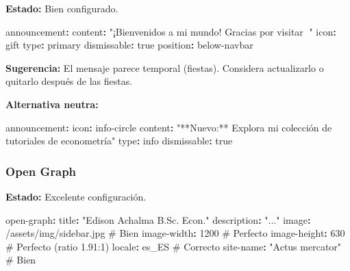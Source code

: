 \documentclass[
  doc,
  floatsintext,
  longtable,
  a4paper,
  nolmodern,
  notxfonts,
  notimes,
  12pt,
  colorlinks=true,linkcolor=blue,citecolor=blue,urlcolor=blue]{apa7}
\newenvironment{Shaded}{\begin{snugshade}}{\end{snugshade}}
\newcommand{\AttributeTok}[1]{\textcolor[rgb]{0.40,0.45,0.13}{#1}}
\newcommand{\CharTok}[1]{\textcolor[rgb]{0.13,0.47,0.30}{#1}}
\newcommand{\CommentTok}[1]{\textcolor[rgb]{0.37,0.37,0.37}{#1}}
\newcommand{\DecValTok}[1]{\textcolor[rgb]{0.68,0.00,0.00}{#1}}
\newcommand{\FunctionTok}[1]{\textcolor[rgb]{0.28,0.35,0.67}{#1}}
\newcommand{\KeywordTok}[1]{\textcolor[rgb]{0.00,0.23,0.31}{\textbf{#1}}}
\newcommand{\StringTok}[1]{\textcolor[rgb]{0.13,0.47,0.30}{#1}}
\begin{document}
\textbf{Estado:} Bien configurado.

\begin{Shaded}
\begin{Highlighting}[]
\FunctionTok{announcement}\KeywordTok{:}
\AttributeTok{  }\FunctionTok{content}\KeywordTok{:}\AttributeTok{ }\StringTok{"¡Bienvenidos a mi mundo! Gracias por visitar 🎄"}
\AttributeTok{  }\FunctionTok{icon}\KeywordTok{:}\AttributeTok{ gift}
\AttributeTok{  }\FunctionTok{type}\KeywordTok{:}\AttributeTok{ primary}
\AttributeTok{  }\FunctionTok{dismissable}\KeywordTok{:}\AttributeTok{ }\CharTok{true}
\AttributeTok{  }\FunctionTok{position}\KeywordTok{:}\AttributeTok{ below{-}navbar}
\end{Highlighting}
\end{Shaded}

\textbf{Sugerencia:} El mensaje parece temporal (fiestas). Considera
actualizarlo o quitarlo después de las fiestas.

\textbf{Alternativa neutra:}

\begin{Shaded}
\begin{Highlighting}[]
\FunctionTok{announcement}\KeywordTok{:}
\AttributeTok{  }\FunctionTok{icon}\KeywordTok{:}\AttributeTok{ info{-}circle}
\AttributeTok{  }\FunctionTok{content}\KeywordTok{:}\AttributeTok{ }\StringTok{"**Nuevo:** Explora mi colección de tutoriales de econometría"}
\AttributeTok{  }\FunctionTok{type}\KeywordTok{:}\AttributeTok{ info}
\AttributeTok{  }\FunctionTok{dismissable}\KeywordTok{:}\AttributeTok{ }\CharTok{true}
\end{Highlighting}
\end{Shaded}

\subsubsection{Open Graph}\label{open-graph-1}

\textbf{Estado:} Excelente configuración.

\begin{Shaded}
\begin{Highlighting}[]
\FunctionTok{open{-}graph}\KeywordTok{:}
\AttributeTok{  }\FunctionTok{title}\KeywordTok{:}\AttributeTok{ }\StringTok{"Edison Achalma B.Sc. Econ."}
\AttributeTok{  }\FunctionTok{description}\KeywordTok{:}\AttributeTok{ }\StringTok{"..."}
\AttributeTok{  }\FunctionTok{image}\KeywordTok{:}\AttributeTok{ /assets/img/sidebar.jpg}\CommentTok{                 \# Bien}
\AttributeTok{  }\FunctionTok{image{-}width}\KeywordTok{:}\AttributeTok{ }\DecValTok{1200}\CommentTok{                              \# Perfecto}
\AttributeTok{  }\FunctionTok{image{-}height}\KeywordTok{:}\AttributeTok{ }\DecValTok{630}\CommentTok{                              \# Perfecto (ratio 1.91:1)}
\AttributeTok{  }\FunctionTok{locale}\KeywordTok{:}\AttributeTok{ es\_ES}\CommentTok{                                  \# Correcto}
\AttributeTok{  }\FunctionTok{site{-}name}\KeywordTok{:}\AttributeTok{ }\StringTok{"Actus mercator"}\CommentTok{                    \# Bien}
\end{Highlighting}
\end{Shaded}
\end{document}
